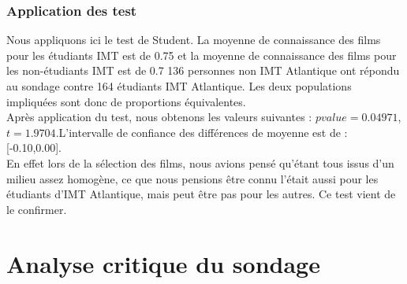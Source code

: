 \documentclass{article} %
\begin{document}
\subsubsection{ Application des test}
Nous appliquons ici le test de Student.
La moyenne de connaissance des films pour les étudiants IMT est de 0.75 et la moyenne de connaissance des films pour les non-étudiants IMT est de 0.7
136 personnes non IMT Atlantique ont répondu au sondage contre 164 étudiants IMT Atlantique. Les deux populations impliquées sont donc de proportions équivalentes.\\
Après application du test, nous obtenons les valeurs suivantes : $pvalue =   0.04971$, $t = 1.9704$.L'intervalle de confiance des différences de moyenne est de : [-0.10,0.00].\\
En effet lors de la sélection des films, nous avions pensé qu'étant tous issus d'un milieu assez homogène, ce que nous pensions être connu l'était aussi pour les étudiants d'IMT Atlantique, mais peut être pas pour les autres. Ce test vient de le confirmer. 

\section{Analyse critique du sondage}
\end{document}
